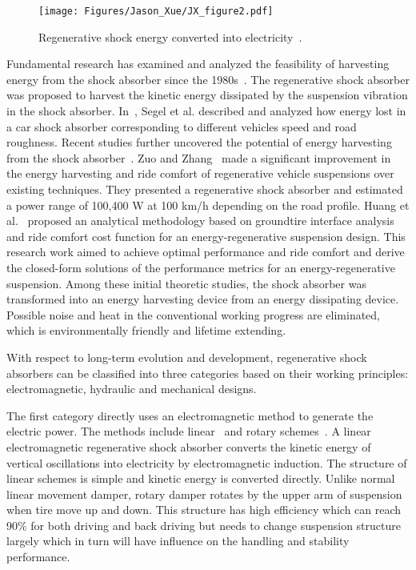 \begin{figure}
\centering
\texttt{[image: Figures/Jason\_Xue/JX\_figure2.pdf]}
\caption{Regenerative shock energy converted into electricity~\cite{JX_75}.}
\label{JX_image2}
\end{figure}      

Fundamental research has examined and analyzed the feasibility of harvesting energy from the shock absorber since the 1980s~\cite{JX_61}. The regenerative shock absorber was proposed to harvest the kinetic energy dissipated by the suspension vibration in the shock absorber. In~\cite{JX_61}, Segel et al. described and analyzed how energy lost in a car shock absorber corresponding to different vehicles speed and road roughness. Recent studies further uncovered the potential of energy harvesting from the shock absorber~\cite{JX_28,JX_78}. Zuo and Zhang~\cite{JX_78} made a significant improvement in the energy harvesting and ride comfort of regenerative vehicle suspensions over existing techniques. They presented a regenerative shock absorber and estimated a power range of 100,400 W at 100 km/h depending on the road profile. Huang et al.~\cite{JX_28} proposed an analytical methodology based on groundtire interface analysis and ride comfort cost function for an energy-regenerative suspension design. This research work aimed to achieve optimal performance and ride comfort and derive the closed-form solutions of the performance metrics for an energy-regenerative suspension. Among these initial theoretic studies, the shock absorber was transformed into an energy harvesting device from an energy dissipating device. Possible noise and heat in the conventional working progress are eliminated, which is environmentally friendly and lifetime extending.

With respect to long-term evolution and development, regenerative shock absorbers can be classified into three categories based on their working principles: electromagnetic, hydraulic and mechanical designs.

The first category directly uses an electromagnetic method to generate the electric power. The methods include linear~\cite{JX_23,JX_33,JX_69,JX_72,JX_77} and rotary schemes~\cite{JX_24,JX_42}. A linear electromagnetic regenerative shock absorber converts the kinetic energy of vertical oscillations into electricity by electromagnetic induction. The structure of linear schemes is simple and kinetic energy is converted directly. Unlike normal linear movement damper, rotary damper rotates by the upper arm of suspension when tire move up and down. This structure has high efficiency which can reach 90\% for both driving and back driving but needs to change suspension structure largely which in turn will have influence on the handling and stability performance.

